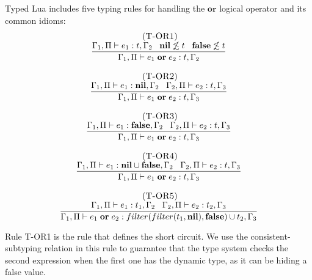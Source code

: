 Typed Lua includes five typing rules for handling the $\mathbf{or}$
logical operator and its common idioms:
\[
\begin{array}{c}
\begin{array}{c}
\; (\textsc{T-OR1})\\
\dfrac{\Gamma_{1}, \Pi \vdash e_{1}:t, \Gamma_{2} \;\;\;
       \mathbf{nil} \not\lesssim t \;\;\;
       \mathbf{false} \not\lesssim t}
      {\Gamma_{1}, \Pi \vdash e_{1} \; \mathbf{or} \; e_{2}:t, \Gamma_{2}}
\end{array}
\\ \\
\begin{array}{c}
\; (\textsc{T-OR2})\\
\dfrac{\Gamma_{1}, \Pi \vdash e_{1}:\mathbf{nil}, \Gamma_{2} \;\;\;
       \Gamma_{2}, \Pi \vdash e_{2}:t, \Gamma_{3}}
      {\Gamma_{1}, \Pi \vdash e_{1} \; \mathbf{or} \; e_{2}:t, \Gamma_{3}}
\end{array}
\\ \\
\begin{array}{c}
\; (\textsc{T-OR3})\\
\dfrac{\Gamma_{1}, \Pi \vdash e_{1}:\mathbf{false}, \Gamma_{2} \;\;\;
       \Gamma_{2}, \Pi \vdash e_{2}:t, \Gamma_{3}}
      {\Gamma_{1}, \Pi \vdash e_{1} \; \mathbf{or} \; e_{2}:t, \Gamma_{3}}
\end{array}
\\ \\
\begin{array}{c}
\; (\textsc{T-OR4})\\
\dfrac{\Gamma_{1}, \Pi \vdash e_{1}:\mathbf{nil} \cup \mathbf{false}, \Gamma_{2} \;\;\;
       \Gamma_{2}, \Pi \vdash e_{2}:t, \Gamma_{3}}
      {\Gamma_{1}, \Pi \vdash e_{1} \; \mathbf{or} \; e_{2}:t, \Gamma_{3}}
\end{array}
\\ \\
\begin{array}{c}
\; (\textsc{T-OR5})\\
\dfrac{\Gamma_{1}, \Pi \vdash e_{1}:t_{1}, \Gamma_{2} \;\;\;
       \Gamma_{2}, \Pi \vdash e_{2}:t_{2}, \Gamma_{3}}
      {\Gamma_{1}, \Pi \vdash e_{1} \; \mathbf{or} \; e_{2}:filter(filter(t_{1}, \mathbf{nil}), \mathbf{false}) \cup t_{2}, \Gamma_{3}}
\end{array}
\end{array}
\]

Rule \textsc{T-OR1} is the rule that defines the short circuit.
We use the consistent-subtyping relation in this rule to guarantee that
the type system checks the second expression when the first one
has the dynamic type, as it can be hiding a false value.

